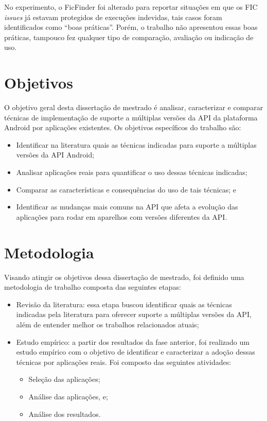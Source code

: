 No experimento, o FicFinder foi alterado para reportar situações em que os FIC
\textit{issues} já estavam protegidos de execuções indevidas, tais casos foram
identificados como “boas práticas”. Porém, o trabalho não apresentou essas boas
práticas, tampouco fez qualquer tipo de comparação, avaliação ou indicação de uso.

\section{Objetivos} \label{sec:objetivos-gerais-especificos}

O objetivo geral desta dissertação de mestrado é analisar, caracterizar e comparar
técnicas de implementação de suporte a múltiplas versões da API da plataforma
Android por aplicações existentes. Os objetivos específicos do trabalho são:
\begin{itemize}
	\item Identificar na literatura quais as técnicas indicadas para suporte a
	múltiplas versões da API Android;
	\item Analisar aplicações reais para quantificar o uso dessas técnicas indicadas;
	\item Comparar as características e consequências do uso de tais técnicas; e
	\item Identificar as mudanças mais comuns na API que afeta a evolução das
	aplicações para rodar em aparelhos com versões diferentes da API.
\end{itemize}

\section{Metodologia} \label{sec:metodologia}

Visando atingir os objetivos dessa dissertação de mestrado, foi definido uma
metodologia de trabalho composta das seguintes etapas:
\begin{itemize}
	\item Revisão da literatura: essa etapa buscou identificar quais as técnicas
	indicadas pela literatura para oferecer suporte a múltiplas versões da API,
	além de entender melhor os trabalhos relacionados atuais;
	\item Estudo empírico: a partir dos resultados da fase anterior, foi realizado
	um estudo empírico com o objetivo de identificar e caracterizar a adoção dessas
	técnicas por aplicações reais. Foi composto das seguintes atividades:
	\begin{itemize}
	    \item Seleção das aplicações;
	    \item Análise das aplicações, e;
	    \item Análise dos resultados.    
	\end{itemize}
\end{itemize}


